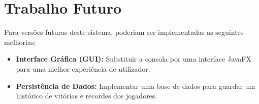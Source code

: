 \documentclass[11pt,a4paper,oneside]{report}
\begin{document}
\section{Trabalho Futuro}
Para versões futuras deste sistema, poderiam ser implementadas as seguintes melhorias:
\begin{itemize}
    \item \textbf{Interface Gráfica (GUI):} Substituir a consola por uma interface JavaFX para uma melhor experiência de utilizador.
    \item \textbf{Persistência de Dados:} Implementar uma base de dados para guardar um histórico de vitórias e recordes dos jogadores.
\end{itemize}



\nocite{*} 


\end{document}

